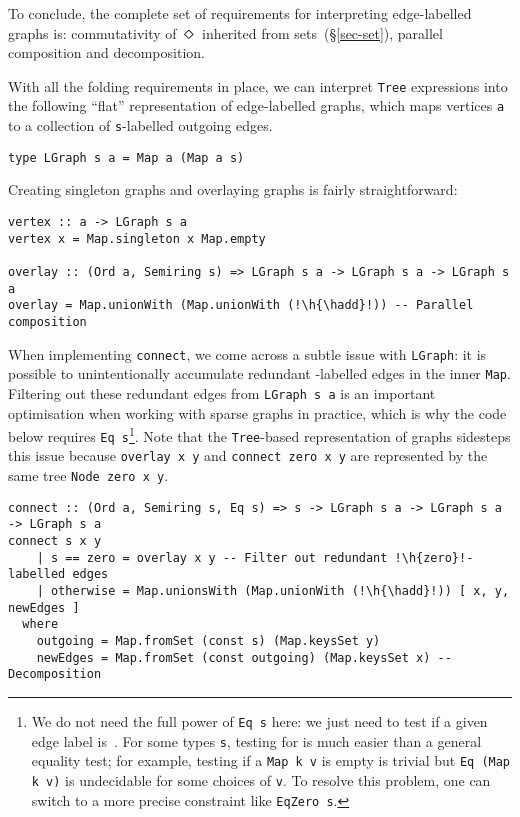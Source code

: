 \documentclass[crc,english]{programming}
\newcommand{\hcode}[1]{{\color{darkblue} \lstinline[keywordstyle={}]|#1|}} %
\newcommand{\h}[1]{{\itshape\color{grayblue}#1}} %
\newcommand{\hadd}{{\large\color{darkblue} $\oplus$}}
\newcommand{\zero}{\raisebox{-0.2mm}{\textcircled{\textsf{0}}}\xspace}
\newcommand{\dia}{\,\text{\raisebox{-0.3mm}{\Large $\diamond$}}\,}
\begin{document}
\noindent
To conclude, the complete set of requirements for interpreting edge-labelled
graphs is: commutativity of $\dia$ inherited from sets~(\S\ref{sec-set}),
parallel composition and decomposition.

\newpage
\noindent
With all the folding requirements in place, we can interpret \hcode{Tree}
expressions into the following ``flat'' representation of edge-labelled graphs,
which maps vertices \hcode{a} to a collection of \hcode{s}-labelled outgoing
edges.


\begin{lstlisting}
type LGraph s a = Map a (Map a s)
\end{lstlisting}

\noindent
Creating singleton graphs and overlaying graphs is fairly straightforward:

\begin{lstlisting}
vertex :: a -> LGraph s a
vertex x = Map.singleton x Map.empty

overlay :: (Ord a, Semiring s) => LGraph s a -> LGraph s a -> LGraph s a
overlay = Map.unionWith (Map.unionWith (!\h{\hadd}!)) -- Parallel composition
\end{lstlisting}

\noindent
When implementing \hcode{connect}, we come across a subtle issue with
\hcode{LGraph}: it is possible to unintentionally accumulate redundant
\zero-labelled edges in the inner \hcode{Map}. Filtering out these redundant
edges from \hcode{LGraph s a} is an important optimisation when working
with sparse graphs in practice, which is why the code below requires
\hcode{Eq s}\footnote{
    We do not need the full power of \hcode{Eq s} here: we just need to test if
    a given edge label is~\zero. For some types \hcode{s}, testing for \zero is
    much easier than a general equality test; for example, testing if a
    \hcode{Map k v} is empty is trivial but \hcode{Eq (Map k v)} is undecidable
    for some choices of \hcode{v}. To resolve this problem, one can switch to a
    more precise constraint like \hcode{EqZero s}.
}. Note that the \hcode{Tree}-based representation of graphs sidesteps this
issue because \hcode{overlay x y} and \hcode{connect zero x y} are represented
by the same tree \hcode{Node zero x y}.

\begin{lstlisting}
connect :: (Ord a, Semiring s, Eq s) => s -> LGraph s a -> LGraph s a -> LGraph s a
connect s x y
    | s == zero = overlay x y -- Filter out redundant !\h{zero}!-labelled edges
    | otherwise = Map.unionsWith (Map.unionWith (!\h{\hadd}!)) [ x, y, newEdges ]
  where
    outgoing = Map.fromSet (const s) (Map.keysSet y)
    newEdges = Map.fromSet (const outgoing) (Map.keysSet x) -- Decomposition
\end{lstlisting}
\end{document}
